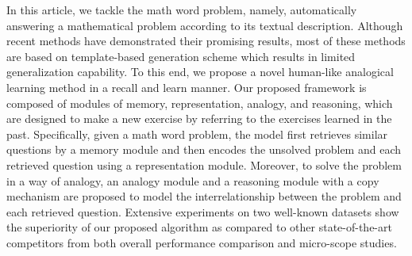 In this article, we tackle the math word problem, namely, automatically answering a mathematical problem according to its textual description. Although recent methods have demonstrated their promising results, most of these methods are based on template-based generation scheme which results in limited generalization capability. To this end, we propose a novel human-like analogical learning method in a recall and learn manner. Our proposed framework is composed of modules of memory, representation, analogy, and reasoning, which are designed to make a new exercise by referring to the exercises learned in the past. Specifically, given a math word problem, the model first retrieves similar questions by a memory module and then encodes the unsolved problem and each retrieved question using a representation module. Moreover, to solve the problem in a way of analogy, an analogy module and a reasoning module with a copy mechanism are proposed to model the interrelationship between the problem and each retrieved question. Extensive experiments on two well-known datasets show the superiority of our proposed algorithm as compared to other state-of-the-art competitors from both overall performance comparison and micro-scope studies.
